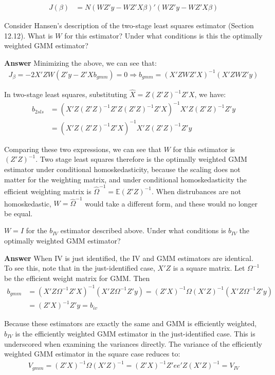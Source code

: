 \documentclass[11pt]{exam}
\begin{document}
\begin{questions}
\begin{align*}
J(\beta) &= N(WZ'y - WZ'X\beta)'(WZ'y - WZ'X\beta)
\end{align*}

\question Consider Hansen’s description of the two-stage least squares estimator (Section 12.12). What is $W$ for this estimator? Under what conditions is this the optimally weighted GMM estimator?

\textbf{Answer} Minimizing the above, we can see that:
\begin{align*}
J_\beta = -2X'ZW(Z'y - Z'Xb_{gmm}) = 0 \Rightarrow b_{gmm} = (X'ZWZ'X)^{-1}(X'ZWZ'y)
\end{align*}

In two-stage least squares, substituting $\hat{X} = Z(Z'Z)^{-1}Z'X$, we have:
\begin{align*}
b_{2sls} &= (X'Z(Z'Z)^{-1}Z'Z(Z'Z)^{-1}Z'X)^{-1}X'Z(Z'Z)^{-1}Z'y \\
&= (X'Z(Z'Z)^{-1}Z'X)^{-1}X'Z(Z'Z)^{-1}Z'y
\end{align*}

Comparing these two expressions, we can see that $W$ for this estimator is $(Z'Z)^{-1}$. Two stage least squares therefore is the optimally weighted GMM estimator under conditional homoskedasticity, because the scaling does not matter for the weighting matrix, and under conditional homoskedasticity the efficient weighting matrix is $\hat{\Omega}^{-1} = \mathbb{E}(Z'Z)^{-1}$. When distrubances are not homoskedastic, $W = \hat{\Omega}^{-1}$ would take a different form, and these would no longer be equal. 

\question $W = I$ for the $b_{IV}$ estimator described above. Under what conditions is $b_{IV}$ the optimally weighted GMM estimator?

\textbf{Answer} When IV is just identified, the IV and GMM estimators are identical. To see this, note that in the just-identified case, $X'Z$ is a square matrix. Let $\Omega^{-1}$ be the efficient weight matrix for GMM. Then
\begin{align*}
b_{gmm} &= (X'Z\Omega^{-1}Z'X)^{-1}(X'Z\Omega^{-1}Z'y) = (Z'X)^{-1}\Omega(X'Z)^{-1}(X'Z\Omega^{-1}Z'y) \\
 &= (Z'X)^{-1}Z'y = b_{iv}
\end{align*}

Because these estimators are exactly the same and GMM is efficiently weighted, $b_{IV}$ is the efficiently weighted GMM estimator in the just-identified case. This is underscored when examining the variances directly. The variance of the efficiently weighted GMM estimator in the square case reduces to:
\begin{align*}
V_{gmm} = (Z'X)^{-1}\Omega (X'Z)^{-1} = (Z'X)^{-1}Z'ee'Z(X'Z)^{-1} = V_{IV}
\end{align*}



\end{questions}
\end{document}
